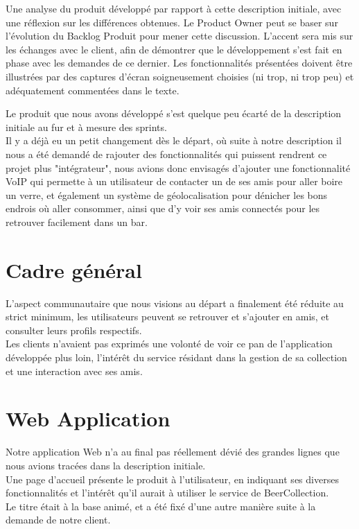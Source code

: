 \documentclass{report}
\begin{document}

	Une analyse du produit développé par rapport à cette description initiale, avec une réflexion sur les différences obtenues.  Le Product Owner peut se baser sur l’évolution du Backlog Produit pour mener cette discussion.  L’accent sera mis sur les échanges avec le client, afin de démontrer que le développement s’est fait en phase avec les demandes de ce dernier.  Les fonctionnalités présentées doivent être illustrées par des captures d’écran soigneusement choisies (ni trop, ni trop peu) et adéquatement commentées dans le texte. 

	Le produit que nous avons développé s'est quelque peu écarté de la description initiale au fur et à mesure des sprints.\\
	Il y a déjà eu un petit changement dès le départ, où suite à notre description il nous a été demandé de rajouter des fonctionnalités qui puissent rendrent ce projet plus "intégrateur", nous avions donc envisagés d'ajouter une fonctionnalité VoIP qui permette à un utilisateur de contacter un de ses amis pour aller boire un verre, et également un système de géolocalisation pour dénicher les bons endrois où aller consommer, ainsi que d'y voir ses amis connectés pour les retrouver facilement dans un bar.\\

	\section{Cadre général}

		L'aspect communautaire que nous visions au départ a finalement été réduite au strict minimum, les utilisateurs peuvent se retrouver et s'ajouter en amis, et consulter leurs profils respectifs.\\
		Les clients n'avaient pas exprimés une volonté de voir ce pan de l'application développée plus loin, l'intérêt du service résidant dans la gestion de sa collection et une interaction avec ses amis.\\

	\section{Web Application}

		Notre application Web n'a au final pas réellement dévié des grandes lignes que nous avions tracées dans la description initiale.\\

		Une page d'accueil présente le produit à l'utilisateur, en indiquant ses diverses fonctionnalités et l'intérêt qu'il aurait à utiliser le service de BeerCollection.\\
		Le titre était à la base animé, et a été fixé d'une autre manière suite à la demande de notre client.\\
\end{document}
